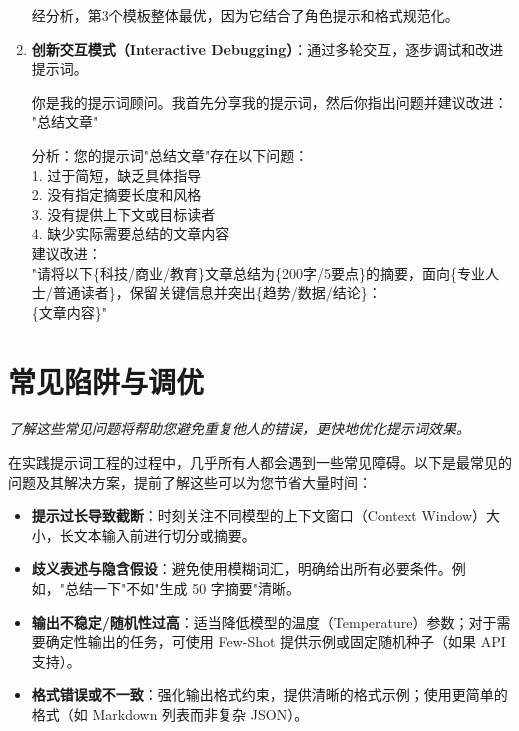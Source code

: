 \documentclass[12pt]{ctexart}
\newcommand{\chapternote}[1]{\vspace{-0.3cm}\par\noindent\textit{\small #1}\vspace{0.3cm}}
\begin{document}
\begin{enumerate}[label=\arabic*.]
\begin{outputbox}
  经分析，第3个模板整体最优，因为它结合了角色提示和格式规范化。
  \end{outputbox}
  
  \item \textbf{创新交互模式（Interactive Debugging）}：通过多轮交互，逐步调试和改进提示词。
  \begin{promptbox}
  你是我的提示词顾问。我首先分享我的提示词，然后你指出问题并建议改进：\\
  "总结文章"
  \end{promptbox}
  \begin{outputbox}
  分析：您的提示词"总结文章"存在以下问题：\\
  1. 过于简短，缺乏具体指导\\
  2. 没有指定摘要长度和风格\\
  3. 没有提供上下文或目标读者\\
  4. 缺少实际需要总结的文章内容\\
  
  建议改进：\\
  "请将以下\{科技/商业/教育\}文章总结为\{200字/5要点\}的摘要，面向\{专业人士/普通读者\}，保留关键信息并突出\{趋势/数据/结论\}：\\
  \{文章内容\}"
  \end{outputbox}
\end{enumerate}

\section{常见陷阱与调优}
\chapternote{了解这些常见问题将帮助您避免重复他人的错误，更快地优化提示词效果。}

在实践提示词工程的过程中，几乎所有人都会遇到一些常见障碍。以下是最常见的问题及其解决方案，提前了解这些可以为您节省大量时间：

\begin{itemize}
  \item \textbf{提示过长导致截断}：时刻关注不同模型的上下文窗口（Context Window）大小，长文本输入前进行切分或摘要。
  \item \textbf{歧义表述与隐含假设}：避免使用模糊词汇，明确给出所有必要条件。例如，"总结一下"不如"生成 50 字摘要"清晰。
  \item \textbf{输出不稳定/随机性过高}：适当降低模型的温度（Temperature）参数；对于需要确定性输出的任务，可使用 Few-Shot 提供示例或固定随机种子（如果 API 支持）。
  \item \textbf{格式错误或不一致}：强化输出格式约束，提供清晰的格式示例；使用更简单的格式（如 Markdown 列表而非复杂 JSON）。
\end{itemize}
\end{document}
